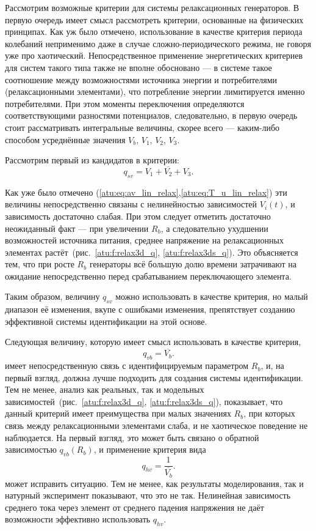 Рассмотрим возможные критерии для системы релаксационных
генераторов. В первую очередь имеет смысл
рассмотреть критерии, основанные на физических принципах.
Как уж было отмечено, использование в качестве критерия периода
колебаний неприменимо даже в случае сложно-периодического режима,
не говоря уже про хаотический.
Непосредственное применение энергетических критериев
для систем такого типа также не вполне обосновано ---
в системе такое соотношение между возможностями источника энергии
и потребителями (релаксационными элементами), что
потребление энергии лимитируется именно потребителями.
При этом моменты переключения определяются соответствующими разностями
потенциалов, следовательно, в первую очередь стоит рассматривать
интегральные величины, скорее всего --- каким-либо способом усреднённые значения
$V_b$, $V_1$, $V_2$, $V_3$.

Рассмотрим первый из кандидатов в критерии:
\begin{equation}
  q_{sv} = \overline{V_1+V_2+V_3} .
  \label{atu:eq:q_sv_relax}
\end{equation}


Как уже было отмечено (\ref{atu:eq:av_lin_relax},\ref{atu:eq:T_u_lin_relax})
эти величины непосредственно связаны с нелинейностью
зависимостей $V_i(t)$, и зависимость достаточно слабая.
При этом следует отметить достаточно неожиданный факт ---
при увеличении $R_b$, а следовательно ухудшении
возможностей источника питания, среднее напряжение
на релаксационных элементах растёт~(рис.~\ref{atu:f:relax3d_q}, \ref{atu:f:relax3ds_q}).
Это объясняется тем,
что при росте $R_b$ генераторы всё большую долю времени
затрачивают на ожидание непосредственно перед срабатыванием переключающего
элемента.

Таким образом, величину $q_{sv}$ можно использовать в качестве критерия,
но малый диапазон её изменения, вкупе с ошибками изменения,
препятствует созданию эффективной системы идентификации на этой основе.


Следующая величину, которую имеет смысл использовать в качестве критерия,
%
\begin{equation}
  q_{vb} = \overline{V_b} .
  \label{atu:eq:q_vb_relax}
\end{equation}
%
имеет непосредственную связь с идентифицируемым параметром $R_b$,
и, на первый взгляд, должна лучше подходить для
создания системы идентификации. Тем не менее,
анализ как реальных, так и модельных
зависимостей~(рис.~\ref{atu:f:relax3d_q}, \ref{atu:f:relax3ds_q}),
показывает, что данный критерий имеет преимущества при малых значениях $R_b$,
при которых связь между релаксационными элементами слаба,
и не хаотическое поведение не наблюдается. На первый взгляд,
это может быть связано о обратной зависимостью $q_{vb}(R_b)$,
и применение критерия вида
%
\begin{equation}
  q_{hv} = \frac{1}{\overline{V_b}} .
  \label{atu:eq:q_hb_relax}
\end{equation}
может исправить ситуацию. Тем не менее,
как результаты моделирования, так и натурный эксперимент
показывают, что это не так. Нелинейная
зависимость среднего тока через элемент
от среднего падения напряжения не даёт возможности
эффективно использовать $q_{hv}$.

